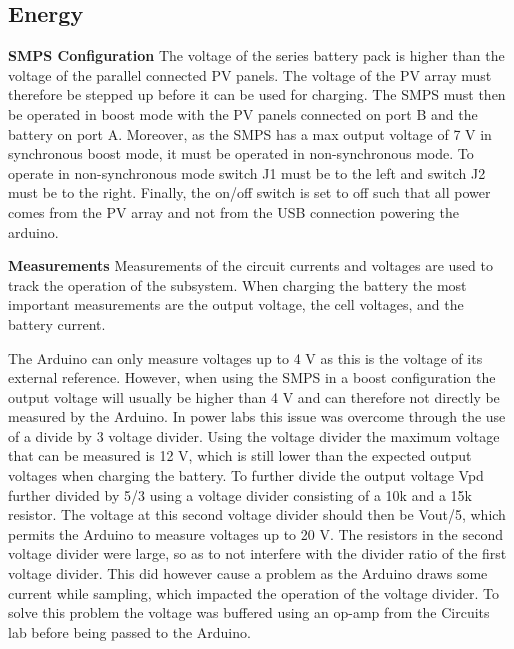 \documentclass[a4paper]{article}
\begin{document}
\subsection{Energy}

\textbf{SMPS Configuration}
\vspace{10pt} 
\newline
The voltage of the series battery pack is higher than the voltage of the parallel connected
PV panels. The voltage of the PV array must therefore be stepped up before it can be used
for charging. The SMPS must then be operated in boost mode with the
PV panels connected on port B and the battery on port A. Moreover, as the 
SMPS has a max output voltage of 7 V in synchronous boost mode\cite{powerLogbook}, 
it must be operated in non-synchronous mode. To operate in non-synchronous mode switch J1
must be to the left and switch J2 must be to the right. Finally, the on/off switch is 
set to off such that all power comes from the PV array and not from the USB connection 
powering the arduino.

\textbf{Measurements}
\vspace{10pt} 
\newline
Measurements of the circuit currents and voltages are used to track the operation of the
subsystem. When charging the battery the most important measurements are the output voltage,
the cell voltages, and the battery current.

The Arduino can only measure voltages up to 4 V as this is the voltage of its external
reference. However, when using the SMPS in a boost configuration the output voltage will
usually be higher than 4 V and can therefore not directly be measured by the Arduino.
In power labs this issue was overcome through the use of a divide by 3 voltage divider\cite{powerLogbook}.
Using the voltage divider the maximum voltage that can be measured is 12 V, which is still
lower than the expected output voltages when charging the battery. To further divide
the output voltage Vpd further divided by 5/3 using a voltage divider consisting of a 10k
and a 15k resistor. The voltage at this second voltage divider should then be Vout/5, 
which permits the Arduino to measure voltages up to 20 V. The
resistors in the second voltage divider were large, so as to not interfere with the divider
ratio of the first voltage divider. This did however cause a problem as the Arduino draws
some current while sampling, which impacted the operation of the voltage divider. 
To solve this problem the voltage was buffered using an op-amp 
from the Circuits lab before being passed to the Arduino.
\end{document}
